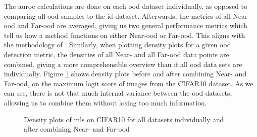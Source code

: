 \documentclass[UKenglish]{uiomasterthesis} %
\theoremstyle{definition}
\begin{document}
The \ac{auroc} calculations are done on each \ac{ood} dataset individually, as opposed to comparing all \ac{ood} samples to the \ac{id} dataset. Afterwards, the metrics of all Near-\ac{ood} and Far-\ac{ood} are averaged, giving us two general performance metrics which tell us how a method functions on either Near-\ac{ood} or Far-\ac{ood}. This aligns with the methodology of \cite{openood}. Similarly, when plotting density plots for a given \ac{ood} detection metric, the densities of all Near- and all Far-\ac{ood} data points are combined, giving a more comprehensible overview than if all \ac{ood} data sets are individually. Figure \ref{fig:full_not_full} shows density plots before and after combining Near- and Far-\ac{ood}, on the maximum logit score of images from the CIFAR10 dataset. As we can see, there is not that much internal variance between the \ac{ood} datasets, allowing us to combine them without losing too much information.

\begin{figure}[H]
    \begin{center}
        
    \end{center}
    \caption{Density plots of \acs*{mls} on CIFAR10 for all datasets individually and after combining Near- and Far-\acs*{ood}}
    \label{fig:full_not_full}
\end{figure}

%
%
\end{document}
